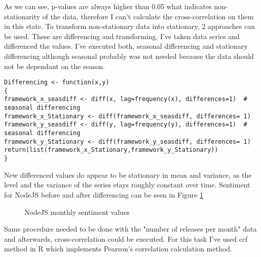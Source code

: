 As we can see, p-values are always higher than 0.05 what indicates non-stationarity of the data, therefore I can't calculate the cross-correlation on them in this state. To transform non-stationary data into stationary, 2 approaches can be used. These are differencing and transforming.  I've taken data series and differenced the values. I've executed both, seasonal differencing and stationary differencing although seasonal probably was not needed because the data should not be dependant on the season.


\begin{lstlisting}
Differencing <- function(x,y)
{
framework_x_seasdiff <- diff(x, lag=frequency(x), differences=1)  # seasonal differencing
framework_x_Stationary <- diff(framework_x_seasdiff, differences= 1)
framework_y_seasdiff <- diff(y, lag=frequency(y), differences=1)  # seasonal differencing
framework_y_Stationary <- diff(framework_y_seasdiff, differences= 1)
return(list(framework_x_Stationary,framework_y_Stationary))
}
\end{lstlisting}

New differenced values do appear to be stationary in mean and variance, as the level and the variance of the series stays roughly constant over time. Sentiment for NodeJS before and after differencing can be seen in Figure \ref{fig:NodeJS_Sentiment_before_after}

\begin{figure}[H]%
    \centering
    \qquad
    \caption{NodeJS monthly sentiment values}%
    \label{fig:NodeJS_Sentiment_before_after}%
\end{figure}

Same procedure needed to be done with the "number of releases per month" data and afterwards, cross-correlation could be executed. For this task I've used ccf method in R which implements Pearson's correlation calculation method.